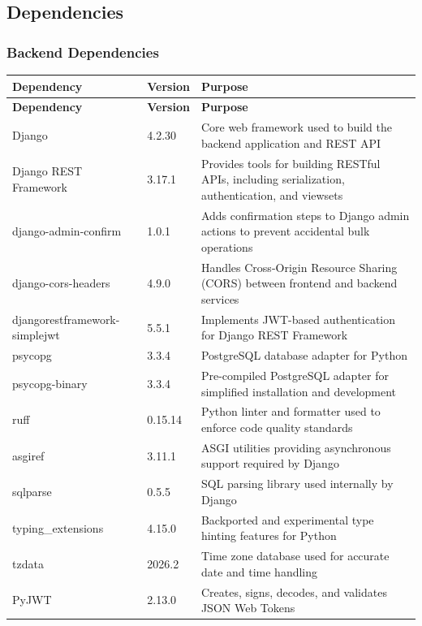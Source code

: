 \subsection{Dependencies}
\subsubsection{Backend Dependencies}

\begin{longtable}{L{3.6cm} C{2.0cm} L{8.8cm}}
  \color{white}\bfseries Dependency &
  \color{white}\bfseries Version &
  \color{white}\bfseries Purpose \\
  \endfirsthead
  \color{white}\bfseries Dependency &
  \color{white}\bfseries Version &
  \color{white}\bfseries Purpose \\
  \endhead
  Django & 4.2.30 & Core web framework used to build the backend application and REST API \\
  Django REST Framework & 3.17.1 & Provides tools for building RESTful APIs, including serialization, authentication, and viewsets \\
  django-admin-confirm & 1.0.1 & Adds confirmation steps to Django admin actions to prevent accidental bulk operations \\
  django-cors-headers & 4.9.0 & Handles Cross-Origin Resource Sharing (CORS) between frontend and backend services \\
  djangorestframework-simplejwt & 5.5.1 & Implements JWT-based authentication for Django REST Framework \\
  psycopg & 3.3.4 & PostgreSQL database adapter for Python \\
  psycopg-binary & 3.3.4 & Pre-compiled PostgreSQL adapter for simplified installation and development \\
  ruff & 0.15.14 & Python linter and formatter used to enforce code quality standards \\
  asgiref & 3.11.1 & ASGI utilities providing asynchronous support required by Django \\
  sqlparse & 0.5.5 & SQL parsing library used internally by Django \\
  typing\_extensions & 4.15.0 & Backported and experimental type hinting features for Python \\
  tzdata & 2026.2 & Time zone database used for accurate date and time handling \\
  PyJWT & 2.13.0 & Creates, signs, decodes, and validates JSON Web Tokens \\
\end{longtable}
